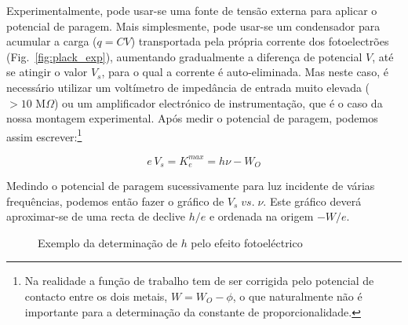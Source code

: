 \documentclass[a4paper,12pt]{article}  %
\begin{document}
Experimentalmente, pode usar-se uma fonte de tensão externa para aplicar o potencial de paragem. Mais simplesmente, pode usar-se um condensador para acumular a carga ($q=C V$) transportada pela própria corrente dos fotoelectrões (Fig.~\ref{fig:plack_exp}), aumentando gradualmente a diferença de potencial $V$, até se atingir o valor $V_s$, para o qual a corrente é  auto-eliminada. Mas neste caso, é necessário utilizar um voltímetro de impedância de entrada muito elevada ($> 10\textrm{ M}\Omega$) ou um amplificador electrónico de instrumentação, que é o caso da nossa montagem experimental.
 Após medir o potencial de paragem, podemos assim escrever:\footnote{Na realidade a função de trabalho tem de ser corrigida pelo potencial de contacto entre os dois metais, $W=W_O - \phi$, o que naturalmente não é importante para a determinação da constante de proporcionalidade.}

\begin{equation}
	\label{eq:energia}
	e\,V_s= K_e^{max}= h \nu - W_O
\end{equation}

Medindo o potencial de paragem sucessivamente para luz incidente de várias frequências, podemos então fazer o gráfico de $V_s\; vs. \;\nu$. Este gráfico deverá aproximar-se de uma recta de declive $h/e$ e ordenada na origem  $-W/e$.


\begin{figure}[htb]   
\begin{center}
  \sansmath

	\caption{Exemplo da determinação de $h$ pelo efeito fotoeléctrico}
	 \label{fig:hplot} 
	\end{center}
\end{figure}
\end{document}
